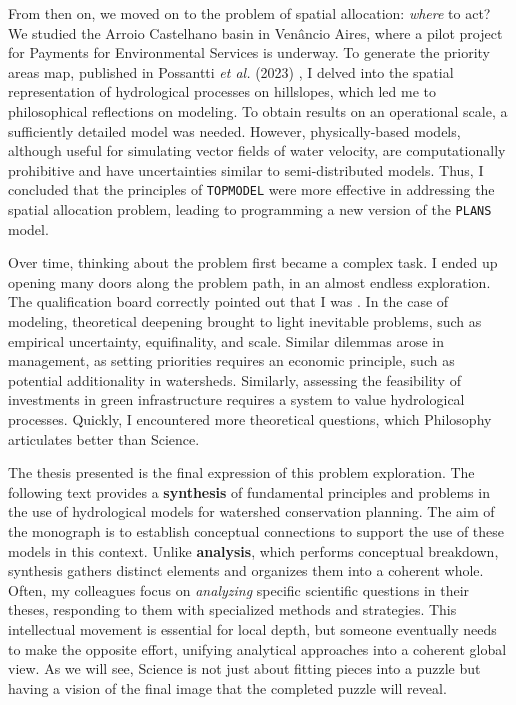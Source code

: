 \documentclass[./main_en.tex]{subfiles}
\begin{document}
\par From then on, we moved on to the problem of spatial allocation: \textit{where} to act? We studied the Arroio Castelhano basin in Venâncio Aires, where a pilot project for Payments for Environmental Services is underway. To generate the priority areas map, published in Possantti \textit{et al.} (2023) \cite{Possantti2023a}, I delved into the spatial representation of hydrological processes on hillslopes, which led me to philosophical reflections on modeling. To obtain results on an operational scale, a sufficiently detailed model was needed. However, physically-based models, although useful for simulating vector fields of water velocity, are computationally prohibitive and have uncertainties similar to semi-distributed models. Thus, I concluded that the principles of \texttt{TOPMODEL} were more effective in addressing the spatial allocation problem, leading to programming a new version of the \texttt{PLANS} model.

\par Over time, thinking about the problem first became a complex task. I ended up opening many doors along the problem path, in an almost endless exploration. The qualification board correctly pointed out that I was . In the case of modeling, theoretical deepening brought to light inevitable problems, such as empirical uncertainty, equifinality, and scale. Similar dilemmas arose in management, as setting priorities requires an economic principle, such as potential additionality in watersheds. Similarly, assessing the feasibility of investments in green infrastructure requires a system to value hydrological processes. Quickly, I encountered more theoretical questions, which Philosophy articulates better than Science.

\par The thesis presented is the final expression of this problem exploration. The following text provides a \textbf{synthesis} of fundamental principles and problems in the use of hydrological models for watershed conservation planning. The aim of the monograph is to establish conceptual connections to support the use of these models in this context. Unlike \textbf{analysis}, which performs conceptual breakdown, synthesis gathers distinct elements and organizes them into a coherent whole. Often, my colleagues focus on \textit{analyzing} specific scientific questions in their theses, responding to them with specialized methods and strategies. This intellectual movement is essential for local depth, but someone eventually needs to make the opposite effort, unifying analytical approaches into a coherent global view. As we will see, Science is not just about fitting pieces into a puzzle but having a vision of the final image that the completed puzzle will reveal.
\end{document}
